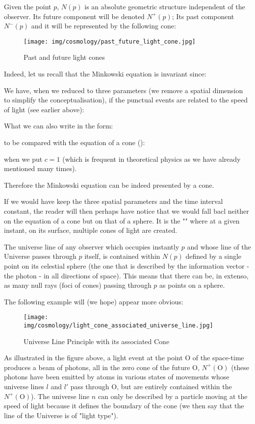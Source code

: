 	Given the point $p$, $N(p)$ is an absolute geometric structure independent of the observer. Its future component will be denoted $N^{+}(p)$; Its past component $N^{-}(p)$ and it will be represented by the following cone:
	\begin{figure}[H]
		\centering
		\texttt{[image: img/cosmology/past\_future\_light\_cone.jpg]}
		\caption{Past and future light cones}	
	\end{figure}
	Indeed, let us recall that the Minkowski equation is invariant since:
	
	We have, when we reduced to three parameters (we remove a spatial dimension to simplify the conceptualisation), if the punctual events are related to the speed of light (see earlier above):
	
	What we can also write in the form:
	
	to be compared with the equation of a cone ():
	
	when we put $c = 1$ (which is frequent in theoretical physics as we have already mentioned many times).

	Therefore the Minkowski equation can be indeed presented by a cone.
	\begin{tcolorbox}[title=Remark,colframe=black,arc=10pt]
	If we would have keep the three spatial parameters and the time interval constant, the reader will then perhaps have notice that we would fall bacl neither on the equation of a cone but on that of a sphere. It is the "" where at a given instant, on its surface, multiple cones of light are created.
	\end{tcolorbox}
	The universe line of any observer which occupies instantly $p$ and whose line of the Universe passes through $p$ itself, is contained within $N(p)$ defined by a single point on its celestial sphere (the one that is described by the information vector - the photon - in all directions of space). This means that there can be, in extenso, as many null rays (foci of cones) passing through $p$ as points on a sphere.

	The following example will (we hope) appear more obvious:
	\begin{figure}[H]
		\centering
		\texttt{[image: img/cosmology/light\_cone\_associated\_universe\_line.jpg]}
		\caption{Universe Line Principle with its associated Cone}	
	\end{figure}
	As illustrated in the figure above, a light event at the point O of the space-time produces a beam of photons, all in the zero cone of the future O, $N^{+}(\text{O})$ (these photons have been emitted by atoms in various states of movements whose universe lines $l$ and $l'$ pass through O, but are entirely contained within the $N^{+}(\text{O})$). The universe line $n$ can only be described by a particle moving at the speed of light because it defines the boundary of the cone (we then say that the line of the Universe is of "light type").
	
